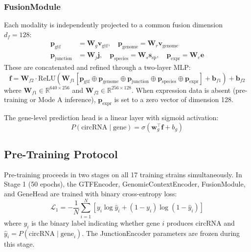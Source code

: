 \documentclass[12pt]{article}
\begin{document}
\subsubsection{FusionModule}

Each modality is independently projected to a common fusion dimension $d_f = 128$:
\begin{align}
\mathbf{p}_\text{gtf} &= \mathbf{W}_g \mathbf{v}_\text{gtf}, \quad
\mathbf{p}_\text{genome} = \mathbf{W}_r \mathbf{v}_\text{genome} \\
\mathbf{p}_\text{junction} &= \mathbf{W}_j \mathbf{j}, \quad
\mathbf{p}_\text{species} = \mathbf{W}_s \mathbf{s}_\text{sp}, \quad
\mathbf{p}_\text{expr} = \mathbf{W}_e \mathbf{e}
\end{align}
These are concatenated and refined through a two-layer MLP:
\begin{equation}
\mathbf{f} = \mathbf{W}_{f2} \cdot \text{ReLU}\left(\mathbf{W}_{f1} \left[\mathbf{p}_\text{gtf} \oplus \mathbf{p}_\text{genome} \oplus \mathbf{p}_\text{junction} \oplus \mathbf{p}_\text{species} \oplus \mathbf{p}_\text{expr}\right] + \mathbf{b}_{f1}\right) + \mathbf{b}_{f2}
\end{equation}
where $\mathbf{W}_{f1} \in \mathbb{R}^{640 \times 256}$ and $\mathbf{W}_{f2} \in \mathbb{R}^{256 \times 128}$. When expression data is absent (pre-training or Mode A inference), $\mathbf{p}_\text{expr}$ is set to a zero vector of dimension 128.

The gene-level prediction head is a linear layer with sigmoid activation:
\begin{equation}
P(\text{circRNA} \mid \text{gene}) = \sigma(\mathbf{w}_g^\top \mathbf{f} + b_g)
\end{equation}

\subsection{Pre-Training Protocol}

Pre-training proceeds in two stages on all 17 training strains simultaneously. In Stage 1 (50 epochs), the GTFEncoder, GenomicContextEncoder, FusionModule, and GeneHead are trained with binary cross-entropy loss:
\begin{equation}
\mathcal{L}_1 = -\frac{1}{N} \sum_{i=1}^{N} \left[ y_i \log \hat{y}_i + (1-y_i) \log(1-\hat{y}_i) \right]
\end{equation}
where $y_i$ is the binary label indicating whether gene $i$ produces circRNA and $\hat{y}_i = P(\text{circRNA} \mid \text{gene}_i)$. The JunctionEncoder parameters are frozen during this stage.
\end{document}

